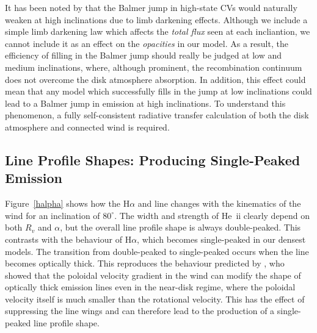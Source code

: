 \documentclass[preprint, a4paper, 11pt]{aastex}
\begin{document}
It has been noted by \cite{ladous1989, ladous1989b}
that the Balmer jump in high-state CVs would naturally weaken at
high inclinations due to limb darkening effects. 
Although we include a simple limb darkening law which affects 
the {\em total flux} seen at each incliantion, we cannot
include it as an effect on the {\em opacities} in our model.
As a result, the efficiency of filling in the Balmer jump
should really be judged at low and medium inclinations, 
where, although prominent, the recombination continuum does
not overcome the disk atmosphere absorption. 
In addition, this effect 
could mean that any model which successfully fills in the 
jump at low inclinations could lead to a Balmer jump 
in emission at high inclinations.
To understand this phenomenon, a fully self-consistent
radiative transfer calculation of both the disk atmosphere
and connected wind is required.


\subsection{Line Profile Shapes: Producing Single-Peaked Emission}

Figure~\ref{halpha} shows how the H$\alpha$ and 
line changes with the kinematics of the wind 
for an inclination of $80^\circ$. The width and strength of He~{\sc ii} 
clearly depend on both $R_v$ and $\alpha$, but the overall line profile 
shape is always double-peaked. This contrasts with the behaviour of 
H$\alpha$, which becomes single-peaked in our densest models. The transition from
double-peaked to single-peaked occurs when the line becomes optically
thick. This reproduces the behaviour predicted by \cite{MC96}, who
showed that the poloidal velocity gradient in the wind can modify the
shape of optically thick emission lines even in the near-disk regime,
where the poloidal velocity itself is much smaller than the rotational
velocity. This has the effect of suppressing the line wings and
can therefore lead to the production of a single-peaked line profile
shape.
\end{document}
